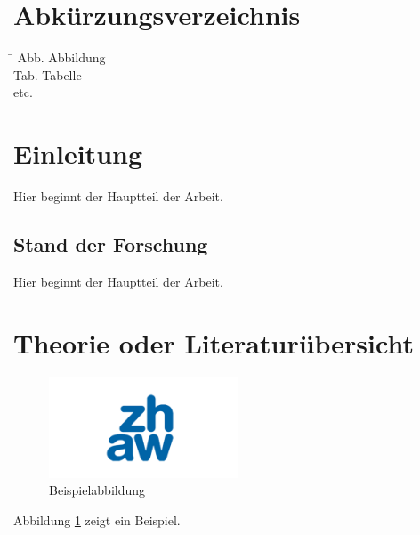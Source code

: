 \documentclass[a4paper,12pt,twoside]{article}
\begin{document}
	\section*{Abkürzungsverzeichnis}
	\begin{tabbing}
		\hspace*{3cm} \= \kill
		Abb. \> Abbildung\\
		Tab. \> Tabelle\\
		etc.
	\end{tabbing}
	
	
	\newpage
	\tableofcontents
	\thispagestyle{empty}
	
	
	\newpage
	\pagestyle{standard} %
	\section{Einleitung}
	Hier beginnt der Hauptteil der Arbeit.
	\subsection{Stand der Forschung}
	Hier beginnt der Hauptteil der Arbeit.
	
	
	\newpage
	\section{Theorie oder Literaturübersicht}
	
	\begin{figure}[b] %
		\raggedright %
		\includegraphics[width=0.5\textwidth]{zhawGR_logo.png} %
		\caption{Beispielabbildung}
		\label{fig:beispiel}
	\end{figure}
	Abbildung \ref{fig:beispiel} zeigt ein Beispiel.
	
\end{document}
